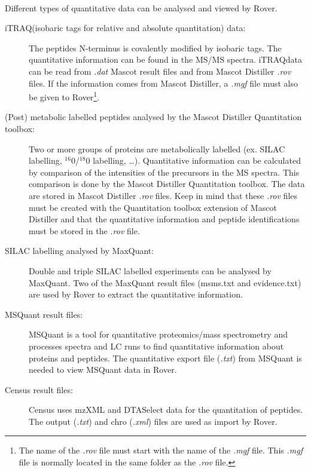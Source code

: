 \documentclass[11pt,a4paper,oneside,notitlepage]{book}
\begin{document}
\paragraph{}Different types of quantitative data can be analysed and viewed by Rover. 
\begin{description}
\item[iTRAQ\texttrademark (isobaric tags for relative and absolute quantitation) data:]The peptides N-terminus is covalently modified by isobaric tags. The quantitative information can be found in the MS/MS spectra. iTRAQ\texttrademark data can be read from \textit{.dat} Mascot result files and from Mascot Distiller \textit{.rov} files. If the information comes from Mascot Distiller, a \textit{.mgf} file must also be given to Rover\footnote{The name of the \textit{.rov} file must start with the name of the \textit{.mgf} file. This \textit{.mgf} file is normally located in the same folder as the \textit{.rov} file.}. 
\item[(Post) metabolic labelled peptides analysed by the Mascot Distiller Quantitation toolbox:]Two or more groups of proteins are metabolically labelled (ex. SILAC labelling, $^{16}$0/$^{18}$0 labelling, \ldots). Quantitative information can be calculated by comparison of the intensities of the precursors in the MS spectra. This comparison is done by the Mascot Distiller Quantitation toolbox. The data are stored in Mascot Distiller \textit{.rov} files. Keep in mind that these \textit{.rov} files must be created with the Quantitation toolbox extension of Mascot Distiller and that the quantitative information and peptide identifications must be stored in the \textit{.rov} file.
\item[SILAC labelling analysed by MaxQuant:]Double and triple SILAC labelled experiments can be analysed by MaxQuant. Two of the MaxQuant result files (msms.txt and evidence.txt) are used by Rover to extract the quantitative information.
\item[MSQuant result files:]MSQuant is a tool for quantitative proteomics/mass spectrometry and processes spectra and LC runs to find quantitative information about proteins and peptides. The quantitative export file (\textit{.txt}) from MSQuant is needed to view MSQuant data in Rover.
\item[Census result files:]Census uses mzXML and DTASelect data for the quantitation of peptides. The output (\textit{.txt}) and chro (\textit{.xml}) files are used as import by Rover.
\end{description}
\end{document}
